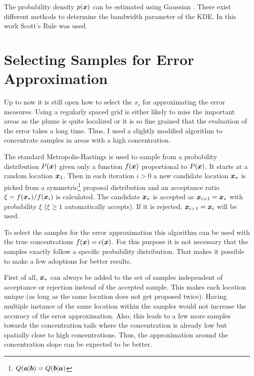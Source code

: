 The probability density $p(\bm{x})$ can be estimated using Gaussian 
. There exist different methods to 
determine the bandwidth parameter of the KDE\@. In this work Scott's Rule 
\parencite{Scott:2009tl} was used.

\section{Selecting Samples for Error Approximation}\label{sec:mh}
Up to now it is still open how to select the $x_i$ for approximating the error 
measures.  Using a regularly spaced grid is either likely to miss the important 
areas as the plume is quite localized or it is so fine grained that the 
evaluation of the error takes a long time. Thus, I used a slightly modified 
 algorithm to concentrate samples in areas with 
a high concentration.

The standard Metropolis-Hastings \parencite{Chib:1994ud} is used to sample from 
a probability distribution $P(\bm{x})$ given only a function $f(\bm{x})$ 
proportional to $P(\bm{x})$. It starts at a random location $\bm{x}_1$.  Then in 
each iteration $i > 0$ a new candidate location $\bm{x}_*$ is picked from 
a symmetric\footnote{$Q(\bm{a} | \bm{b}) = Q(\bm{b} | \bm{a})$} proposal 
distribution and an acceptance ratio $\xi = f(\bm{x}_*) / f(\bm{x}_i)$ is 
calculated. The candidate $\bm{x}_*$ is accepted as $\bm{x}_{i + 1} = \bm{x}_*$ 
with probability $\xi$ ($\xi \geq 1$ automatically accepts). If it is rejected, 
$\bm{x}_{i + 1} = \bm{x}_i$ will be used.

To select the samples for the error approximation this algorithm can be used 
with the true concentrations $f(\bm{x}) = c(\bm{x})$. For this purpose it is not 
necessary that the samples exactly follow a specific probability distribution.  
That makes it possible to make a few adoptions for better results.

First of all, $\bm{x}_*$ can always be added to the set of samples independent of 
acceptance or rejection instead of the accepted sample.  This makes each 
location unique (as long as the same location does not get proposed twice).  
Having multiple instance of the same location within the samples would not 
increase the accuracy of the error approximation. Also, this leads to a few more 
samples towards the concentration tails where the concentration is already low 
but spatially close to high concentrations.  Thus, the approximation around the 
concentration slope can be expected to be better.

